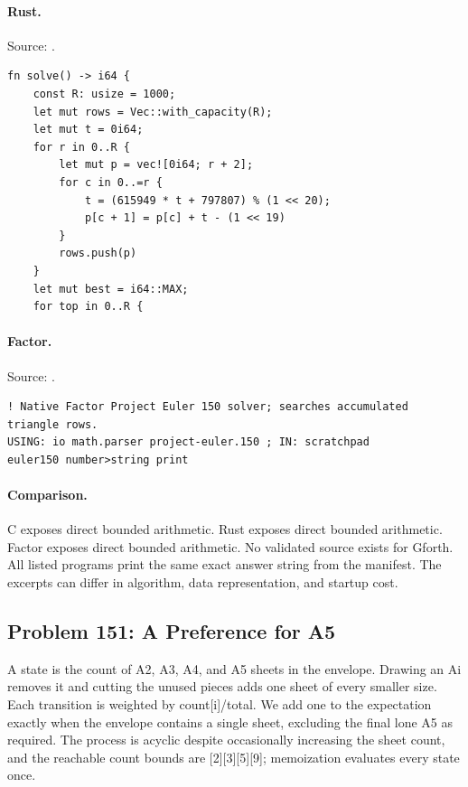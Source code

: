 \paragraph{Rust.} Source: .
\begin{lstlisting}
fn solve() -> i64 {
    const R: usize = 1000;
    let mut rows = Vec::with_capacity(R);
    let mut t = 0i64;
    for r in 0..R {
        let mut p = vec![0i64; r + 2];
        for c in 0..=r {
            t = (615949 * t + 797807) % (1 << 20);
            p[c + 1] = p[c] + t - (1 << 19)
        }
        rows.push(p)
    }
    let mut best = i64::MAX;
    for top in 0..R {
\end{lstlisting}

\paragraph{Factor.} Source: .
\begin{lstlisting}
! Native Factor Project Euler 150 solver; searches accumulated triangle rows.
USING: io math.parser project-euler.150 ; IN: scratchpad
euler150 number>string print
\end{lstlisting}

\paragraph{Comparison.}
C exposes direct bounded arithmetic. Rust exposes direct bounded arithmetic. Factor exposes direct bounded arithmetic.
No validated source exists for Gforth.
All listed programs print the same exact answer string from the manifest. The excerpts can differ in algorithm, data representation, and startup cost.

\subsection{Problem 151: A Preference for A5}
\label{walkthrough:p151}
A state is the count of A2, A3, A4, and A5 sheets in the envelope. Drawing an Ai removes it and cutting the unused pieces adds one sheet of every smaller size. Each transition is weighted by count[i]/total. We add one to the expectation exactly when the envelope contains a single sheet, excluding the final lone A5 as required. The process is acyclic despite occasionally increasing the sheet count, and the reachable count bounds are [2][3][5][9]; memoization evaluates every state once.

